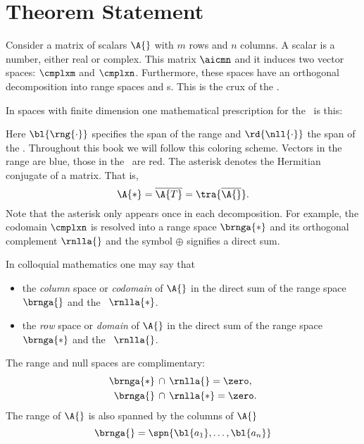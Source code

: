 \section{Theorem Statement}

Consider a matrix of scalars $\A{}$ with $m$ rows and $n$ columns. A scalar is a number, either real or complex. This matrix $\aicmn$ and it induces two vector spaces: $\cmplxm$ and $\cmplxn$. Furthermore, these spaces have an orthogonal decomposition into range spaces and \ns s. This is the crux of the \ft.

In spaces with finite dimension one mathematical prescription for the \ft \ is this:

Here $\bl{\rng{\cdot}}$ specifies the span of the range and $\rd{\nll{\cdot}}$ the span of the \ns. Throughout this book we will follow this coloring scheme. Vectors in the range are blue, those in the \ns \ are red. The asterisk denotes the Hermitian conjugate of a matrix. That is,
%
\begin{equation}
  \A{*} = \overline{\A{T}} = \tra{\overline{\A{}}}.
\end{equation}
%
Note that the asterisk only appears once in each decomposition.
For example, the codomain $\cmplxn$ is resolved into a range space $\brnga{*}$ and its orthogonal complement $\rnlla{}$ and the symbol $\oplus$ signifies a direct sum.

In colloquial mathematics one may say that 
\begin{itemize}
%
\item the \emph{column} space or \emph{codomain} of $\A{}$ in the direct sum of the range space $\brnga{}$ and the \ns \ $\rnlla{*}$.
%
\item the \emph{row} space or \emph{domain} of $\A{}$ in the direct sum of the range space $\brnga{*}$ and the \ns \ $\rnlla{}$.
%
\end{itemize}
%
The range and null spaces are complimentary:
%
\begin{equation}
  \begin{split}
    \brnga{*} \, &\cap \, \rnlla{}  = \zero, \\
    \brnga{}  \, &\cap \, \rnlla{*} = \zero .
  \end{split}
\end{equation}
%
The range of $\A{}$ is also spanned by the columns of $\A{}$ 
%
\begin{equation}
  \brnga{} = \spn{{\bl{ a_{1} }},\dots,{\bl{ a_{n} }}}
\end{equation}
%
%

